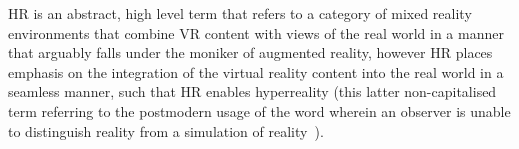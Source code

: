 HR is an abstract, high level term that refers to a category of mixed reality environments that combine VR content with views of the real world in a manner that arguably falls under the moniker of augmented reality, however HR places emphasis on the integration of the virtual reality content into the real world in a seamless manner, such that HR enables hyperreality (this latter non-capitalised term referring to the postmodern usage of the word wherein an observer is unable to distinguish reality from a simulation of reality~\cite{Baudrillard1994}).









